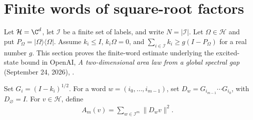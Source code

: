 \section{Finite words of square-root factors}
\label{sec:contraction_word_decay}

Let $\mathcal H=\C^d$, let $\mathcal I$ be a finite set of labels, and write
$N=|\mathcal I|$. Let $\Omega\in\mathcal H$ and put
$P_\Omega=|\Omega\rangle\langle\Omega|$.
Assume $k_i\le I$, $k_i\Omega=0$, and
$\sum_{i\in\mathcal I}k_i\ge g(I-P_\Omega)$ for a real number $g$.
This section proves the finite-word estimate underlying the excited-state
bound in OpenAI, \emph{A two-dimensional area law from a global spectral gap}
(September 24, 2026), \cite{OpenAI2026AreaLaw}.

\begin{definition}
\label{def:contraction_word}
\leanok
Set $G_i=(I-k_i)^{1/2}$. For a word $w=(i_0,\ldots,i_{m-1})$, set
$D_w=G_{i_{m-1}}\cdots G_{i_0}$, with $D_{\varnothing}=I$.
For $v\in\mathcal H$, define
\begin{align}
 A_m(v)=\sum_{w\in\mathcal I^m}\|D_wv\|^2.
 \label{eq:word_decay_sum}
\end{align}
\end{definition}

